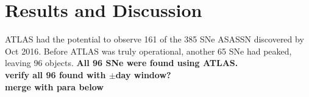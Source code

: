 \documentclass[aps,prb,twocolumn,superscriptaddress]{revtex4-1}
\begin{document}

\section{Results and Discussion}

ATLAS had the potential to observe 161 of the 385 SNe ASASSN discovered 
by Oct 2016.  Before ATLAS was truly operational, another 65 SNe had 
peaked, leaving 96 objects.  
{\bf All 96 SNe were found using ATLAS. }\\
{\bf verify all 96 found with $\pm$day window?}\\
{\bf merge with para below}
\end{document}

